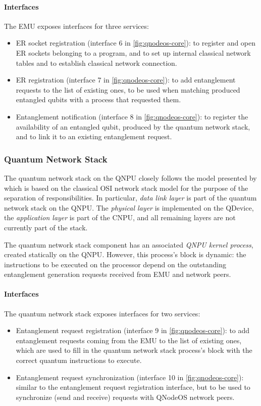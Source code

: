 \paragraph{Interfaces}

The \ac{EMU} exposes interfaces for three services:
%
\begin{itemize}
\item \ac{ER} socket registration (interface 6 in \cref{fig:qnodeos-core}): to register and open \ac{ER} sockets belonging to a program, and to set up internal classical network tables and to establish classical network connection.
\item \ac{ER} registration (interface 7 in \cref{fig:qnodeos-core}): to add entanglement requests to the list of existing ones, to be used when matching produced entangled qubits with a process that requested them.
\item Entanglement notification (interface 8 in \cref{fig:qnodeos-core}): to register the availability of an entangled qubit, produced by the quantum network stack, and to link it to an existing entanglement request.
\end{itemize}

\subsubsection{Quantum Network Stack}

The quantum network stack on the \ac{QNPU} closely follows the model presented by
\textcite{dahlberg_2019_egp} which is based on the classical \ac{OSI} network stack model for the purpose of the separation of responsibilities. In particular, \emph{data link layer} is part of the quantum network stack on the \ac{QNPU}. The \emph{physical layer} is implemented on the \ac{QDevice}, the \emph{application layer} is part of the \ac{CNPU}, and all remaining layers are not currently part of the stack.

The quantum network stack component has an associated \emph{\ac{QNPU} kernel process}, created statically on the \ac{QNPU}. However, this process's block is dynamic: the instructions to be executed on the processor depend on the outstanding entanglement generation requests received from \ac{EMU} and network peers.

\paragraph{Interfaces}

The quantum network stack exposes interfaces for two services:
%
\begin{itemize}
\item Entanglement request registration (interface 9 in \cref{fig:qnodeos-core}): to add entanglement requests coming from the \ac{EMU} to the list of existing ones, which are used to fill in the quantum network stack process's block with the correct quantum instructions to execute.
\item Entanglement request synchronization (interface 10 in \cref{fig:qnodeos-core}): similar to the entanglement request registration interface, but to be used to synchronize (send and receive) requests with \ac{QNodeOS} network peers.
\end{itemize}

